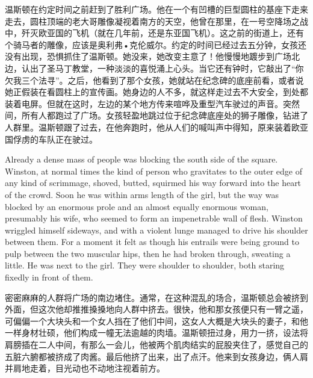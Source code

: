 \begin{paracol}{2}
\switchcolumn

温斯顿在约定时间之前赶到了胜利广场。他在一个有凹槽的巨型圆柱的基座下走来走去，圆柱顶端的老大哥雕像凝视着南方的天空，他曾在那里，在一号空降场之战中，歼灭欧亚国的飞机（就在几年前，还是东亚国飞机）。这之前的街道上，还有个骑马者的雕像，应该是奥利弗•克伦威尔。约定的时间已经过去五分钟，女孩还没有出现，恐惧抓住了温斯顿。她没来，她改变主意了！他慢慢地踱步到广场北边，认出了圣马丁教堂，一种淡淡的喜悦涌上心头。当它还有钟时，它敲出了``你欠我三个法寻''。之后，他看到了那个女孩，她就站在纪念碑的底座前看，或者说她正假装在看圆柱上的宣传画。她身边的人不多，就这样走过去不大安全，到处都装着电屏。但就在这时，左边的某个地方传来喧哗及重型汽车驶过的声音。突然间，所有人都跑过了广场。女孩轻盈地跳过位于纪念碑底座处的狮子雕像，钻进了人群里。温斯顿跟了过去，在他奔跑时，他从人们的喊叫声中得知，原来装着欧亚国俘虏的车队正在驶过。

\switchcolumn*

Already a dense mass of people was blocking the south side of the
square. Winston, at normal times the kind of person who gravitates to
the outer edge of any kind of scrimmage, shoved, butted, squirmed his
way forward into the heart of the crowd. Soon he was within
arm\textquotesingle s length of the girl, but the way was blocked by an
enormous prole and an almost equally enormous woman, presumably his
wife, who seemed to form an impenetrable wall of flesh. Winston wriggled
himself sideways, and with a violent lunge managed to drive his shoulder
between them. For a moment it felt as though his entrails were being
ground to pulp between the two muscular hips, then he had broken
through, sweating a little. He was next to the girl. They were shoulder
to shoulder, both staring fixedly in front of them.

\switchcolumn

密密麻麻的人群将广场的南边堵住。通常，在这种混乱的场合，温斯顿总会被挤到外面，但这次他却推推搡搡地向人群中挤去。很快，他和那女孩便只有一臂之遥，可偏偏一个大块头和一个女人挡在了他们中间，这女人大概是大块头的妻子，和他一样身材壮硕，他们构成一幢无法逾越的肉墙。温斯顿扭过身，用力一挤，设法将肩膀插在二人中间，有那么一会儿，他被两个肌肉结实的屁股夹住了，感觉自己的五脏六腑都被挤成了肉酱。最后他挤了出来，出了点汗。他来到女孩身边，俩人肩并肩地走着，目光动也不动地注视着前方。

\switchcolumn*


\end{paracol}
